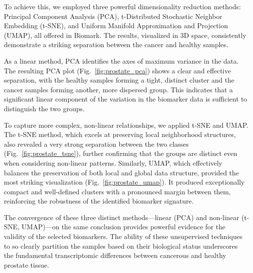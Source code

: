 \documentclass[journal]{IEEEtran}
\begin{document}
To achieve this, we employed three powerful dimensionality reduction methods: Principal Component Analysis (PCA), t-Distributed Stochastic Neighbor Embedding (t-SNE), and Uniform Manifold Approximation and Projection (UMAP), all offered in Biomark. The results, visualized in 3D space, consistently demonstrate a striking separation between the cancer and healthy samples.

As a linear method, PCA identifies the axes of maximum variance in the data. The resulting PCA plot (Fig.~\ref{fig:prostate_pca}) shows a clear and effective separation, with the healthy samples forming a tight, distinct cluster and the cancer samples forming another, more dispersed group. This indicates that a significant linear component of the variation in the biomarker data is sufficient to distinguish the two groups.

To capture more complex, non-linear relationships, we applied t-SNE and UMAP. The t-SNE method, which excels at preserving local neighborhood structures, also revealed a very strong separation between the two classes (Fig.~\ref{fig:prostate_tsne}), further confirming that the groups are distinct even when considering non-linear patterns. Similarly, UMAP, which effectively balances the preservation of both local and global data structure, provided the most striking visualization (Fig.~\ref{fig:prostate_umap}). It produced exceptionally compact and well-defined clusters with a pronounced margin between them, reinforcing the robustness of the identified biomarker signature.

The convergence of these three distinct methods—linear (PCA) and non-linear (t-SNE, UMAP)—on the same conclusion provides powerful evidence for the validity of the selected biomarkers. The ability of these unsupervised techniques to so clearly partition the samples based on their biological status underscores the fundamental transcriptomic differences between cancerous and healthy prostate tissue.


\end{document}
